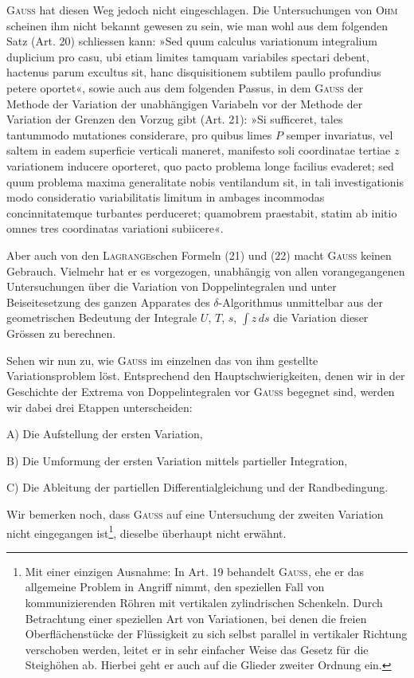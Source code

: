\textsc{Gauss} hat diesen Weg jedoch nicht eingeschlagen. Die Untersuchungen
von \textsc{Ohm} scheinen ihm nicht bekannt gewesen zu sein, wie man wohl aus
dem folgenden Satz (Art. 20) schliessen kann: »Sed quum calculus variationum
integralium duplicium pro casu, ubi etiam limites tamquam variabiles spectari
debent, hactenus parum excultus sit, hanc disquisitionem subtilem paullo profundius
petere oportet«, sowie auch aus dem folgenden Passus, in dem \textsc{Gauss}
der Methode der Variation der unabhängigen Variabeln vor der Methode der
Variation der Grenzen den Vorzug gibt (Art. 21): »Si sufficeret, tales tantummodo
mutationes considerare, pro quibus limes $P$ semper invariatus, vel saltem
in eadem superficie verticali maneret, manifesto soli coordinatae tertiae $z$
variationem inducere oporteret, quo pacto problema longe facilius evaderet;
sed quum problema maxima generalitate nobis ventilandum sit, in tali investigationis
modo consideratio variabilitatis limitum in ambages incommodas concinnitatemque
turbantes perduceret; quamobrem praestabit, statim ab initio
omnes tres coordinatas variationi subiicere«.

Aber auch von den \textsc{Lagrange}schen Formeln (21) und (22) macht \textsc{Gauss}
keinen Gebrauch. Vielmehr hat er es vorgezogen, unabhängig von allen vorangegangenen
Untersuchungen über die Variation von Doppelintegralen und unter
Beiseitesetzung des ganzen Apparates des $\delta$-Algorithmus unmittelbar aus der
geometrischen Bedeutung der Integrale $U$, $T$, $s$, $\int z\,ds$ die Variation dieser
Grössen zu berechnen.

Sehen wir nun zu, wie \textsc{Gauss} im einzelnen das von ihm gestellte Variationsproblem
löst. Entsprechend den Hauptschwierigkeiten, denen wir in der Geschichte
der Extrema von Doppelintegralen vor \textsc{Gauss} begegnet sind, werden
wir dabei drei Etappen unterscheiden:
\par\noindent\hspace*{\parindent}A) Die Aufstellung der ersten Variation,
\par\noindent\hspace*{\parindent}B) Die Umformung der ersten Variation mittels partieller Integration,
\par\noindent\hspace*{\parindent}C) Die Ableitung der partiellen Differentialgleichung und der Randbedingung.
\par\noindent\hspace*{\parindent}Wir bemerken noch, dass \textsc{Gauss} auf eine Untersuchung der zweiten Variation
nicht eingegangen ist\footnote{Mit einer einzigen Ausnahme: In Art. 19 behandelt \textsc{Gauss}, ehe er das allgemeine Problem in Angriff nimmt, den speziellen Fall von kommunizierenden Röhren mit vertikalen zylindrischen Schenkeln.
Durch Betrachtung einer speziellen Art von Variationen, bei denen die freien Oberflächenstücke der Flüssigkeit zu sich selbst parallel in vertikaler Richtung verschoben werden, leitet er in sehr einfacher Weise das Gesetz für die Steighöhen ab. Hierbei geht er auch auf die Glieder zweiter Ordnung ein.}, dieselbe überhaupt nicht erwähnt.
\par\clearpage\endgroup
